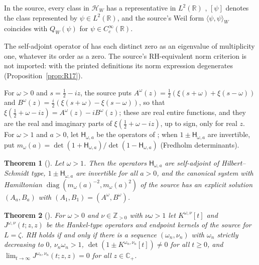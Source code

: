\documentclass[11pt]{amsart}
\theoremstyle{plain}
\newtheorem{theorem}{Theorem}[section]
\theoremstyle{definition}
\theoremstyle{remark}
\numberwithin{equation}{section}
\newcommand{\R}{\mathbb{R}}
\newcommand{\Z}{\mathbb{Z}}
\newcommand{\Cp}{\mathbb{C}_{+}}
\DeclareMathOperator{\diag}{diag}
\begin{document}
In the source, every class in $\mathcal H_W$ has a representative in
$L^2(\R)$ \cite[Theorem~5.5]{Suzuki2023WeilHilbert}, $[\psi]$ denotes
the class represented by $\psi\in L^2(\R)$, and the source's Weil form
$\langle\psi,\psi\rangle_W$ coincides with $Q_W(\psi)$ for
$\psi\in C_c^\infty(\R)$.

The self-adjoint operator of \cite[\S6, p.~18]{Suzuki2023WeilHilbert}
has each distinct zero as an eigenvalue of multiplicity one, whatever its
order as a zero. The source's RH-equivalent norm criterion
\cite[Theorem~1.4, p.~4]{Suzuki2023WeilHilbert} is not imported: with
the printed definitions its norm expression degenerates
(Proposition~\ref{prop:R17}).

For $\omega>0$ and $s=\tfrac12-iz$, the source
\cite[(1.1), p.~1]{Suzuki2012Canonical} puts
$A^\omega(z)=\tfrac12(\xi(s+\omega)+\xi(s-\omega))$ and
$B^\omega(z)=\tfrac i2(\xi(s+\omega)-\xi(s-\omega))$, so that
$\xi(\tfrac12+\omega-iz)=A^\omega(z)-iB^\omega(z)$; these are real
entire functions, and they are the real and imaginary parts of
$\xi(\tfrac12+\omega-iz)$, up to sign, only for real $z$. For
$\omega>1$ and $a>0$, let $\mathsf H_{\omega,a}$ be the operators of
\cite[(2.6), p.~8]{Suzuki2012Canonical}; when
$1\pm\mathsf H_{\omega,a}$ are invertible, put
$m_\omega(a)=\det(1+\mathsf H_{\omega,a})/\det(1-\mathsf H_{\omega,a})$
(Fredholm determinants).

\begin{theorem}[{\cite[Theorem~2.3, p.~8]{Suzuki2012Canonical}}]
\label{thm:imp-sz12}
Let $\omega>1$. Then the operators $\mathsf H_{\omega,a}$ are
self-adjoint of Hilbert--Schmidt type, $1\pm\mathsf H_{\omega,a}$ are
invertible for all $a>0$, and the canonical system with Hamiltonian
$\diag(m_\omega(a)^{-2},m_\omega(a)^2)$ of the source has an explicit
solution $(A_a,B_a)$ with $(A_1,B_1)=(A^\omega,B^\omega)$.
\end{theorem}

\begin{theorem}[{\cite[Theorem~2.4, p.~9]{Suzuki2016Hamiltonians}}]
\label{thm:imp-sz16}
For $\omega>0$ and $\nu\in\Z_{>0}$ with $\nu\omega>1$ let
$K^{\omega,\nu}[t]$ and $J^{\omega,\nu}(t;z,z)$ be the Hankel-type
operators and endpoint kernels of the source for $L=\zeta$. RH holds if
and only if there is a sequence $(\omega_n,\nu_n)$ with $\omega_n$
strictly decreasing to $0$, $\nu_n\omega_n>1$,
$\det(1\pm K^{\omega_n,\nu_n}[t])\ne0$ for all $t\ge0$, and
$\lim_{t\to\infty}J^{\omega_n,\nu_n}(t;z,z)=0$ for all $z\in\Cp$.
\end{theorem}
\end{document}
